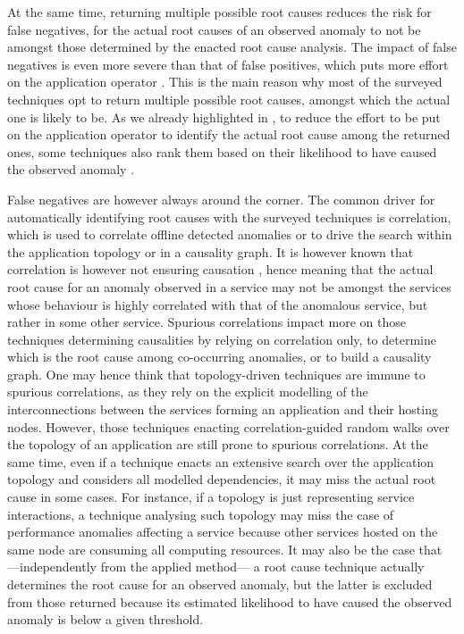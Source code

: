 At the same time, returning multiple possible root causes reduces the risk for false negatives, \viz for the actual root causes of an observed anomaly to not be amongst those determined by the enacted root cause analysis.
The impact of false negatives is even more severe than that of false positives, which puts more effort on the application operator \cite{46_Qiu2020_CausalityMiningKnowledgeGraph}.
This is the main reason why most of the surveyed techniques opt to return multiple possible root causes, amongst which the actual one is likely to be.
As we already highlighted in , to reduce the effort to be put on the application operator to identify the actual root cause among the returned ones, some techniques also rank them based on their likelihood to have caused the observed anomaly \cite{21_Kim2013_RootCauseDetectionSOA}.

False negatives are however always around the corner.
The common driver for automatically identifying root causes with the surveyed techniques is correlation, which is used to correlate offline detected anomalies or to drive the search within the application topology or in a causality graph.
It is however known that correlation is however not ensuring causation \cite{Calude2017_SpuriousCorrelations}, hence meaning that the actual root cause for an anomaly observed in a service may not be amongst the services whose behaviour is highly correlated with that of the anomalous service, but rather in some other service.
Spurious correlations impact more on those techniques determining causalities by relying on correlation only, \eg to determine which is the root cause among co-occurring anomalies, or to build a causality graph.
One may hence think that topology-driven techniques are immune to spurious correlations, as they rely on the explicit modelling of the interconnections between the services forming an application and their hosting nodes. 
However, those techniques enacting correlation-guided random walks over the topology of an application are still prone to spurious correlations.
At the same time, even if a technique enacts an extensive search over the application topology and considers all modelled dependencies, it may miss the actual root cause in some cases.
For instance, if a topology is just representing service interactions, a technique analysing such topology may miss the case of performance anomalies affecting a service because other services hosted on the same node are consuming all computing resources.
It may also be the case that ---independently from the applied method--- a root cause technique actually determines the root cause for an observed anomaly, but the latter is excluded from those returned because its estimated likelihood to have caused the observed anomaly is below a given threshold.

